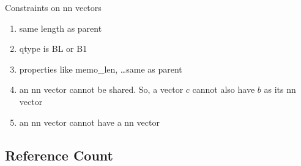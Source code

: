 \documentclass[letterpaper,12pt]{article}
\newcommand{\be}{\begin{enumerate}}
\newcommand{\ee}{\end{enumerate}}
\begin{document}
Constraints on nn vectors
\be
\item same length as parent
\item qtype is BL or B1
\item properties like memo\_len, \ldots same as parent
\item an nn vector cannot be shared. So, a vector \(c\) cannot also have \(b\)
  as its nn vector
\item an nn vector cannot have a nn vector
  \ee

\subsection{Reference Count}
\label{ref_count}
\end{document}

